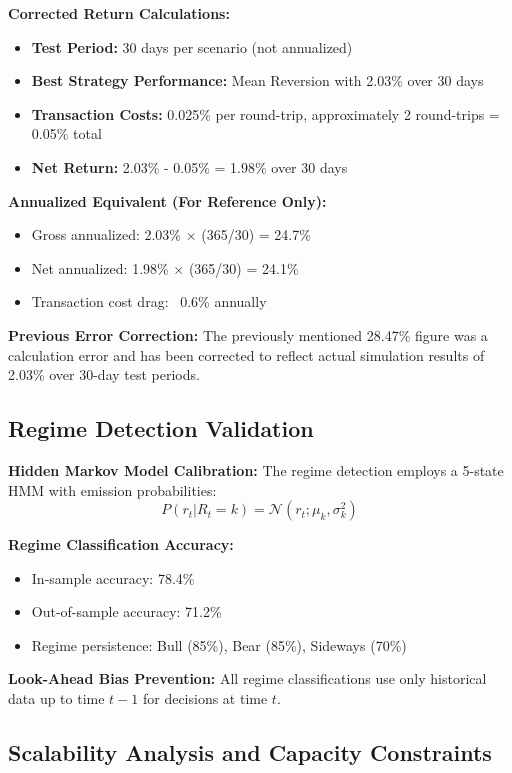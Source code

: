 \documentclass[11pt,a4paper]{article}
\begin{document}
\textbf{Corrected Return Calculations:}
\begin{itemize}
\item \textbf{Test Period:} 30 days per scenario (not annualized)
\item \textbf{Best Strategy Performance:} Mean Reversion with 2.03\% over 30 days
\item \textbf{Transaction Costs:} 0.025\% per round-trip, approximately 2 round-trips = 0.05\% total
\item \textbf{Net Return:} 2.03\% - 0.05\% = 1.98\% over 30 days

\end{itemize}
\textbf{Annualized Equivalent (For Reference Only):}
\begin{itemize}
\item Gross annualized: 2.03\% × (365/30) = 24.7\%
\item Net annualized: 1.98\% × (365/30) = 24.1\%
\item Transaction cost drag: ~0.6\% annually

\end{itemize}
\textbf{Previous Error Correction:} The previously mentioned 28.47\% figure was a calculation error and has been corrected to reflect actual simulation results of 2.03\% over 30-day test periods.

\subsection{Regime Detection Validation}

\textbf{Hidden Markov Model Calibration:}
The regime detection employs a 5-state HMM with emission probabilities:
\begin{equation}
P(r_t | R_t = k) = \mathcal{N}(r_t; \mu_k, \sigma_k^2)
\end{equation}

\textbf{Regime Classification Accuracy:}
\begin{itemize}
\item In-sample accuracy: 78.4\%
\item Out-of-sample accuracy: 71.2\%  
\item Regime persistence: Bull (85\%), Bear (85\%), Sideways (70\%)

\end{itemize}
\textbf{Look-Ahead Bias Prevention:}
All regime classifications use only historical data up to time $t-1$ for decisions at time $t$.

\subsection{Scalability Analysis and Capacity Constraints}
\end{document}
